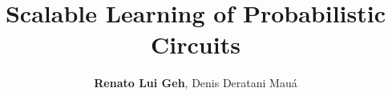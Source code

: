 \documentclass[aspectratio=169]{beamer}
\author{\small\textbf{Renato Lui Geh}, Denis Deratani Mauá}
\subtitle{}
\date{}
\newcommand{\ccimg}{%
  \hspace{0.25cm}\def\svgwidth{0.1\textwidth}%
}
\def\isfinalversion{1}
\def\pagenumbering{}
\begin{document}
\title{\rmfamily\bfseries\LARGE\color{black}Scalable Learning of \color{palette-blue}Probabilistic Circuits}


\ifdefined\isfinalversion

\let\pagenumbering\undefined
\begin{frame}
  \titlepage
  \ccimg
\end{frame}
\def\pagenumbering{}

\end{document}
